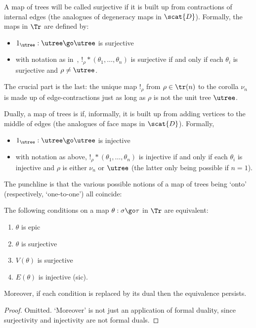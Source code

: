 A map of trees will be called surjective if it is built up from
contractions of internal edges (the analogues of degeneracy%
%
%
maps in
$\scat{D}$).  Formally, the %
%
%
%
%
%
maps in $\Tr$ are defined
by:
%
\begin{itemize}
\item $1_\utree: \utree \go \utree$ is surjective
\item with notation as in~, $!_\rho *
(\theta_1, \ldots, \theta_n)$ is surjective if and only if each $\theta_i$
is surjective and $\rho \neq \utree$.
\end{itemize}
%
The crucial part is the last: the unique map $!_\rho$ from $\rho\in\tr(n)$
to the corolla $\nu_n$ is made up of edge-contractions just as long as
$\rho$ is not the unit tree $\utree$.  

Dually, a map of trees is %
%
%
%
%
if, informally, it is built up
from adding vertices to the middle of edges (the analogues of face%
%
%
maps in
$\scat{D}$).  Formally,
%
\begin{itemize}
\item $1_\utree: \utree \go \utree$ is injective
\item with notation as above, $!_\rho * (\theta_1, \ldots, \theta_n)$ is
injective if and only if each $\theta_i$ is injective and $\rho$ is either
$\nu_n$ or $\utree$ (the latter only being possible if $n = 1$).
\end{itemize}

The punchline is that the various possible notions of a map of trees being
`onto' (respectively, `one-to-one') all coincide:
%
\begin{propn}
The following conditions on a map $\theta: \sigma \go \tau$ in $\Tr$ are
equivalent: 
%
\begin{enumerate}
\item	{}
$\theta$ is epic
\item	{}
$\theta$ is surjective
\item	{}
$V(\theta)$ is surjective
\item	{}
$E(\theta)$ is injective (sic).
\end{enumerate}
%
Moreover, if each condition is replaced by its dual then the equivalence
persists. 
\end{propn}
%
\begin{proof}
Omitted.  `Moreover' is not just an application of formal duality, since
surjectivity and injectivity are not formal duals.  
\done
\end{proof}%
%


